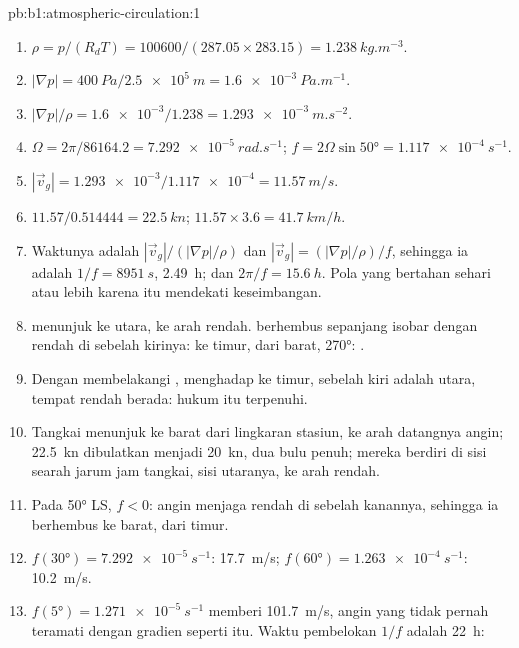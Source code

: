 \begin{solution}{pb:b1:atmospheric-circulation:1}
\begin{enumerate}
  \item $\rho = p/(R_dT) = \num{100600}/(287.05 \times 283.15) =
        \qty{1.238}{kg.m^{-3}}$.
  \item $|\nabla p| = \qty{400}{Pa}/\qty{2.5e5}{m} = \qty{1.6e-3}{Pa.m^{-1}}$.
  \item $|\nabla p|/\rho = \num{1.6e-3}/1.238 = \qty{1.293e-3}{m.s^{-2}}$.
  \item $\Omega = 2\pi/\num{86164.2} = \qty{7.292e-5}{rad.s^{-1}}$;
        $f = 2\Omega\sin\ang{50} = \qty{1.117e-4}{s^{-1}}$.
  \item $|\vec v_g| = \num{1.293e-3}/\num{1.117e-4} = \qty{11.57}{m/s}$.
  \item $11.57/0.514444 = \qty{22.5}{kn}$; $11.57 \times 3.6 = \qty{41.7}{km/h}$.
  \item Waktunya adalah $|\vec v_g|/(|\nabla p|/\rho)$ dan $|\vec v_g| = (|\nabla
        p|/\rho)/f$, sehingga ia adalah $1/f = \qty{8951}{s}$, \qty{2.49}{h}; dan $2\pi/f =
        \qty{15.6}{h}$. Pola yang bertahan sehari atau lebih karena itu mendekati keseimbangan.
  \item {} menunjuk ke utara, ke arah rendah.  berhembus sepanjang isobar dengan rendah di sebelah kirinya: ke timur,
        dari barat,  \ang{270}: .
  \item Dengan membelakangi , menghadap ke timur, sebelah kiri adalah utara, tempat rendah berada: hukum itu terpenuhi.
  \item Tangkai menunjuk ke barat dari lingkaran stasiun, ke arah datangnya angin; \qty{22.5}{kn} dibulatkan menjadi \qty{20}{kn}, dua bulu penuh; mereka berdiri di sisi searah jarum jam tangkai, sisi utaranya, ke arah rendah.
  \item Pada \ang{50} LS, $f < 0$: angin menjaga rendah di sebelah kanannya, sehingga ia berhembus ke barat, dari timur.
  \item $f(\ang{30}) = \qty{7.292e-5}{s^{-1}}$: \qty{17.7}{m/s}; $f(\ang{60}) =
        \qty{1.263e-4}{s^{-1}}$: \qty{10.2}{m/s}.
  \item $f(\ang{5}) = \qty{1.271e-5}{s^{-1}}$ memberi \qty{101.7}{m/s}, angin yang tidak pernah teramati dengan gradien seperti itu. Waktu pembelokan $1/f$ adalah \qty{22}{h}:

\end{enumerate}
\end{solution}

